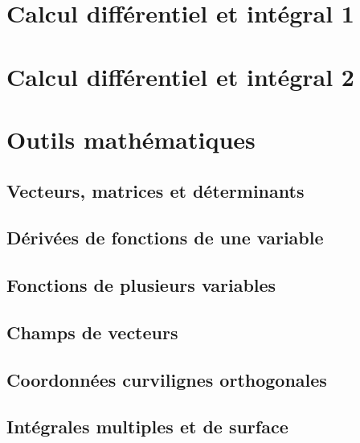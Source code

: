 
\let\CorrectionRepertory\oldCorrectionRepertory
{}


\part{Calcul différentiel et intégral 1}


\part{Calcul différentiel et intégral 2}


\part{Outils mathématiques}

\chapter{Vecteurs, matrices et déterminants}

\chapter{Dérivées de fonctions de une variable}


\chapter{Fonctions de plusieurs variables}


\chapter{Champs de vecteurs}


\chapter{Coordonnées curvilignes orthogonales}


\chapter{Intégrales multiples et de surface}


